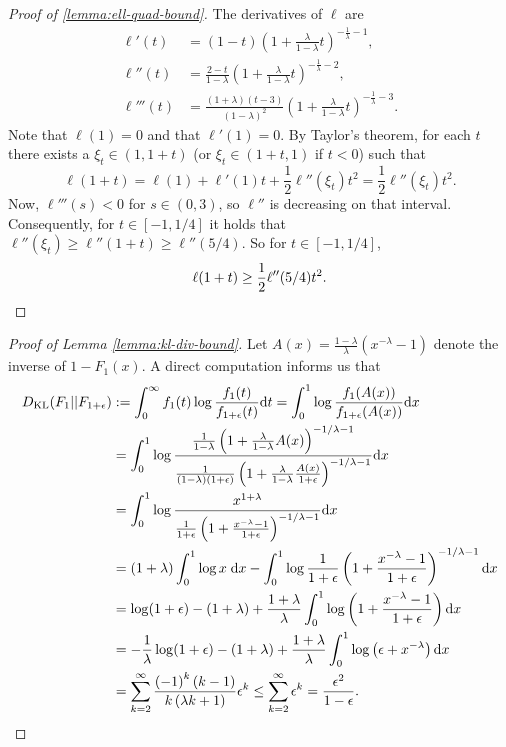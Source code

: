 \documentclass[11pt]{article}
\newcommand{\dd}{\mathrm{d}}
\begin{document}
\begin{proof}[Proof of \ref{lemma:ell-quad-bound}]
    The derivatives of $\ell$ are
    \begin{align*}
        \ell'(t)&=(1-t)\left(1+\frac{\lambda}{1-\lambda}t\right)^{-\frac{1}{\lambda}-1},\\
        \ell''(t)&=\frac{2-t}{1-\lambda}\left(1+\frac{\lambda}{1-\lambda}t\right)^{-\frac{1}{\lambda}-2},\\
        \ell'''(t)&=\frac{\left(1+\lambda\right)\left(t-3\right)}{\left(1-\lambda\right)^{2}}\left(1+\frac{\lambda}{1-\lambda}t\right)^{-\frac{1}{\lambda}-3}.
    \end{align*}
    Note that $\ell(1)=0$ and that $\ell'(1)=0$. By Taylor's theorem, for each $t$ there exists a
    $\xi_t\in(1,1+t)$ (or $\xi_t\in(1+t,1)$ if $t<0$) such that
    $$
    \ell(1+t)=\ell(1)+\ell'(1)t+\frac{1}{2}\ell''(\xi_t)t^2=\frac{1}{2}\ell''(\xi_t)t^2.
    $$
    Now, $\ell'''(s)<0$ for $s\in(0,3)$, so $\ell''$ is decreasing on that interval. Consequently, for $t\in[-1,1/4]$ it holds that $\ell''(\xi_t)\ge \ell''(1+t)\ge \ell''(5/4)$. So for $t\in[-1,1/4]$,
    \begin{equation*}
        \ell(1+t)\ge \frac{1}{2}\ell''(5/4)t^2.\qedhere
    \end{equation*}
\end{proof}

\medskip

\begin{proof}[Proof of Lemma \ref{lemma:kl-div-bound}]
    Let $A(x)=\frac{1-\lambda}{\lambda}\left(x^{-\lambda}-1\right)$
denote the inverse of $1-F_{1}(x)$. A direct computation informs us that
\begin{align*}
    D_{\mathrm{KL}}(F_{1}||F_{1+\epsilon})&:=\int_0^\infty f_{1}(t)\log\frac{f_{1}(t)}{f_{1+\epsilon}(t)}\dd t
    =\int_0^1 \log\frac{f_{1}(A(x))}{f_{1+\epsilon}(A(x))}\dd x\\
    &=\int_0^1 \log
    \frac{\frac{1}{1-\lambda}\left(1+\frac{\lambda}{1-\lambda}A(x)\right)^{-1/\lambda-1}}{\frac{1}{(1-\lambda)(1+\epsilon)}\left(1+\frac{\lambda}{1-\lambda}\frac{A(x)}{1+\epsilon}\right)^{-1/\lambda-1}}\dd x\\
    &=\int_0^1 \log
    \frac{x^{1+\lambda}}{\frac{1}{1+\epsilon}\left(1+\frac{x^{-\lambda}-1}{1+\epsilon}\right)^{-1/\lambda-1}}\dd x\\
    &=(1+\lambda)\int_0^1\log x\;\dd x-\int_0^1 \log
    \frac{1}{1+\epsilon}\left(1+\frac{x^{-\lambda}-1}{1+\epsilon}\right)^{-1/\lambda-1}\dd x\\
    &=\log(1+\epsilon)-(1+\lambda)+\frac{1+\lambda}{\lambda}\int_0^1 \log
    \left(1+\frac{x^{-\lambda}-1}{1+\epsilon}\right)\dd x\\
    &=-\frac{1}{\lambda}\log(1+\epsilon)-(1+\lambda)+\frac{1+\lambda}{\lambda}\int_0^1 \log
    \left(\epsilon+x^{-\lambda}\right)\dd x\\
    &=\sum_{k=2}^{\infty}\frac{\left(-1\right)^{k}\left(k-1\right)}{k\left(\lambda k+1\right)}\epsilon^{k}\le \sum_{k=2}^{\infty}\epsilon^{k}=\frac{\epsilon^2}{1-\epsilon}.\qedhere
\end{align*}
\end{proof}
\end{document}
